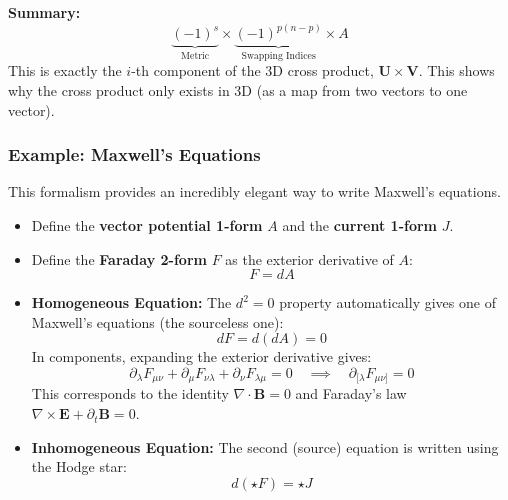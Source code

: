 \documentclass[11pt, a4paper]{report}
\begin{document}
\textbf{Summary:}
\[ \underbrace{(-1)^s}_{\text{Metric}} \times \underbrace{(-1)^{p(n-p)}}_{\text{Swapping Indices}} \times A \]
This is exactly the $i$-th component of the 3D cross product, $\mathbf{U} \times \mathbf{V}$. This shows why the cross product only exists in 3D (as a map from two vectors to one vector).
\subsubsection*{Example: Maxwell's Equations}
This formalism provides an incredibly elegant way to write Maxwell's equations.
\begin{itemize}
    \item Define the \textbf{vector potential 1-form} $A$ and the \textbf{current 1-form} $J$.
    \item Define the \textbf{Faraday 2-form} $F$ as the exterior derivative of $A$:
    \begin{equation}
        F = dA
    \end{equation}
    \item \textbf{Homogeneous Equation:} The $d^2=0$ property automatically gives one of Maxwell's equations (the sourceless one):
    \begin{equation}
        dF = d(dA) = 0
    \end{equation}
    In components, expanding the exterior derivative gives:
    \[ \partial_\lambda F_{\mu\nu} + \partial_\mu F_{\nu\lambda} + \partial_\nu F_{\lambda\mu} = 0 \quad \implies \quad \partial_{[\lambda} F_{\mu\nu]} = 0 \]
    This corresponds to the identity $\nabla \cdot \mathbf{B} = 0$ and Faraday's law $\nabla \times \mathbf{E} + \partial_t \mathbf{B} = 0$.

    \item \textbf{Inhomogeneous Equation:} The second (source) equation is written using the Hodge star:
    \begin{equation}
        d(\star F) = \star J
    \end{equation}
    

\end{itemize}
\end{document}
